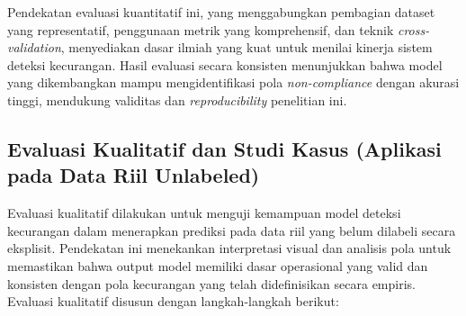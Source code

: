 Pendekatan evaluasi kuantitatif ini, yang menggabungkan pembagian dataset yang representatif, penggunaan metrik yang komprehensif, dan teknik \textit{cross-validation}, menyediakan dasar ilmiah yang kuat untuk menilai kinerja sistem deteksi kecurangan. Hasil evaluasi secara konsisten menunjukkan bahwa model yang dikembangkan mampu mengidentifikasi pola \textit{non-compliance} dengan akurasi tinggi, mendukung validitas dan \textit{reproducibility} penelitian ini.

\subsection{Evaluasi Kualitatif dan Studi Kasus (Aplikasi pada Data Riil Unlabeled)}
\label{sec:evaluasiKualitatifStudiKasus}
Evaluasi kualitatif dilakukan untuk menguji kemampuan model deteksi kecurangan dalam menerapkan prediksi pada data riil yang belum dilabeli secara eksplisit. Pendekatan ini menekankan interpretasi visual dan analisis pola untuk memastikan bahwa output model memiliki dasar operasional yang valid dan konsisten dengan pola kecurangan yang telah didefinisikan secara empiris. Evaluasi kualitatif disusun dengan langkah-langkah berikut:

